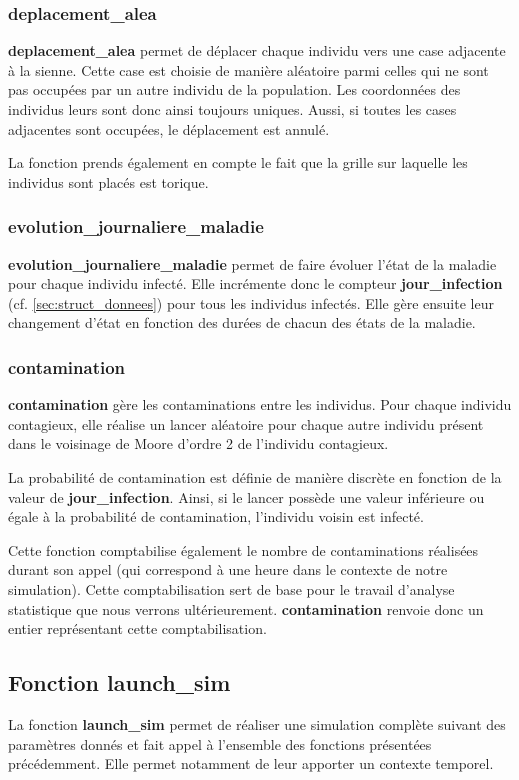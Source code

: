 \documentclass[12pt,french,titlepage]{article}
\begin{document}
\subsubsection{deplacement\_alea}
\textbf{deplacement\_alea} permet de déplacer chaque individu vers une case adjacente à la sienne. Cette case est choisie de manière aléatoire parmi celles qui ne sont pas occupées par un autre individu de la population. Les coordonnées des individus leurs sont donc ainsi toujours uniques. Aussi, si toutes les cases adjacentes sont occupées, le déplacement est annulé.

La fonction prends également en compte le fait que la grille sur laquelle les individus sont placés est torique.



\subsubsection{evolution\_journaliere\_maladie}
\textbf{evolution\_journaliere\_maladie} permet de faire évoluer l'état de la maladie pour chaque individu infecté. Elle incrémente donc le compteur \textbf{jour\_infection} (cf. \ref{sec:struct_donnees}) pour tous les individus infectés. Elle gère ensuite leur changement d'état en fonction des durées de chacun des états de la maladie. 

\subsubsection{contamination}
\textbf{contamination} gère les contaminations entre les individus. Pour chaque individu contagieux, elle réalise un lancer aléatoire pour chaque autre individu présent dans le voisinage de Moore d'ordre 2 de l'individu contagieux. 

La probabilité de contamination est définie de manière discrète en fonction de la valeur de \textbf{jour\_infection}. Ainsi, si le lancer possède une valeur inférieure ou égale à la probabilité de contamination, l'individu voisin est infecté.

Cette fonction comptabilise également le nombre de contaminations réalisées durant son appel (qui correspond à une heure dans le contexte de notre simulation). Cette comptabilisation sert de base pour le travail d'analyse statistique que nous verrons ultérieurement. \textbf{contamination} renvoie donc un entier représentant cette comptabilisation.

\subsection{Fonction launch\_sim}
La fonction \textbf{launch\_sim} permet de réaliser une simulation complète suivant des paramètres donnés et fait appel à l'ensemble des fonctions présentées précédemment. Elle permet notamment de leur apporter un contexte temporel. 
\end{document}
